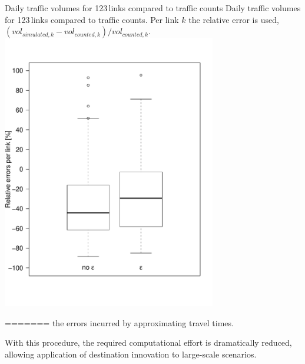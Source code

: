 \createfigure%
{Daily traffic volumes for 123\,links compared to traffic counts}%
{Daily traffic volumes for 123\,links compared to traffic counts. Per link $k$ the relative error is used, \ie $(vol_{simulated,k}-vol_{counted,k}) / vol_{counted,k}$.}%
{\label{fig:countsLEGO}}%
{\includegraphics[width=0.7\textwidth, angle=0]{extending/figures/dc/zhCounts.pdf}}%
{}




=======
the errors incurred by approximating travel times. 

With this procedure, the required computational effort is dramatically reduced, allowing application of destination innovation to large-scale scenarios.

